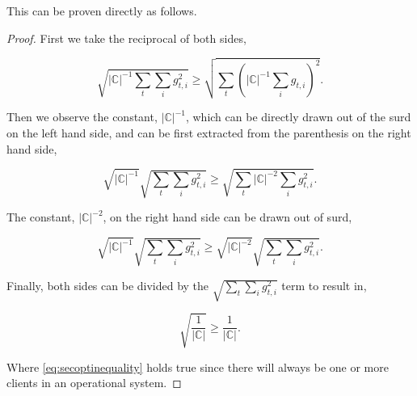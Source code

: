 \documentclass[conference,compsoc]{IEEEtran}
\begin{document}
This can be proven directly as follows.

\begin{proof}
    First we take the reciprocal of both sides,

    \begin{equation*}
        \sqrt{|\mathbb{C}|^{-1} \sum_t \sum_i g_{t, i}^2} \geq \sqrt{\sum_t (|\mathbb{C}|^{-1} \sum_i g_{t, i})^2}.
    \end{equation*}

    Then we observe the constant, $|\mathbb{C}|^{-1}$, which can be directly drawn out of the surd on the left hand side, and can be first extracted from the parenthesis on the right hand side,

    \begin{equation*}
        \sqrt{|\mathbb{C}|^{-1}} \sqrt{\sum_t \sum_i g_{t, i}^2} \geq \sqrt{\sum_t |\mathbb{C}|^{-2} \sum_i g_{t, i}^2}.
    \end{equation*}

    The constant, $|\mathbb{C}|^{-2}$, on the right hand side can be drawn out of surd,

    \begin{equation*}
        \sqrt{|\mathbb{C}|^{-1}} \sqrt{\sum_t \sum_i g_{t, i}^2} \geq \sqrt{|\mathbb{C}|^{-2}} \sqrt{\sum_t \sum_i g_{t, i}^2}.
    \end{equation*}

    Finally, both sides can be divided by the $\sqrt{\sum_t \sum_i g_{t, i}^2}$ term to result in,

    \begin{equation}
        \sqrt{\frac{1}{|\mathbb{C}|}} \geq \frac{1}{|\mathbb{C}|}.
        \label{eq:secoptinequality}
    \end{equation}

    Where \eqref{eq:secoptinequality} holds true since there will always be one or more clients in an operational system.
\end{proof}
\end{document}
